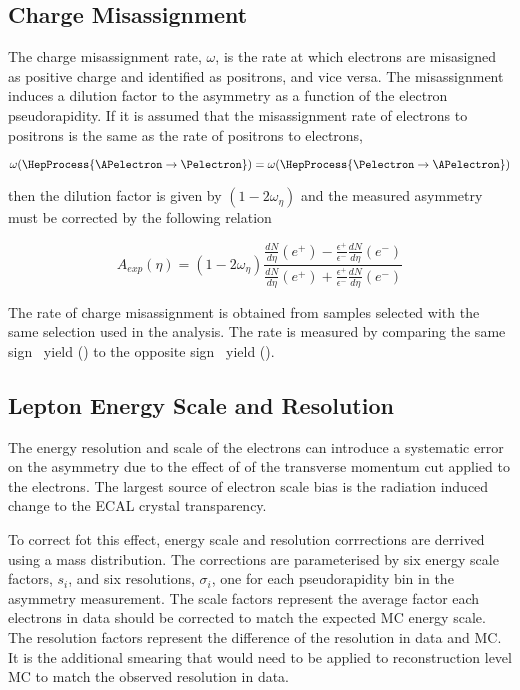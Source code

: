 \subsection{Charge Misassignment}

The charge misassignment rate, $\omega$, is the rate at which electrons are
misasigned as positive charge and identified as positrons, and vice versa. The
misassignment induces a dilution factor to the asymmetry as a function of the
electron pseudorapidity. If it is assumed that the misassignment rate of
electrons to positrons is the same as the rate of positrons to electrons, \ie 

\begin{equation}
  \omega( \HepProcess{\APelectron \to \Pelectron} ) =
  \omega( \HepProcess{\Pelectron \to \APelectron} )
\end{equation}

then the dilution factor is given by $(1-2\omega_\eta)$ and the measured
asymmetry must be corrected by the following relation

\begin{equation}
  A_{exp}(\eta) = (1-2\omega_\eta)
                \frac{
                    \frac{dN}{d\eta}(e^+)-
                    \frac{\epsilon^+}{\epsilon^-}\frac{dN}{d\eta}(e^-)
                }
                {
                    \frac{dN}{d\eta}(e^+)+
                    \frac{\epsilon^+}{\epsilon^-}\frac{dN}{d\eta}(e^-)
                }
\end{equation}

The rate of charge misassignment is obtained from \Zee samples selected with
the same selection used in the analysis. The rate is measured by comparing the
same sign \PZ\ yield (\HepProcess{\PZ\to\Pepm\Pepm}) to the opposite sign \PZ\
yield (\HepProcess{\PZ\to\Pepm\Pemp}).

\subsection{Lepton Energy Scale and Resolution}

The energy resolution and scale of the electrons can introduce a systematic
error on the asymmetry due to the effect of of the transverse momentum cut
applied to the electrons. The largest source of electron scale bias is the
radiation induced change to the ECAL crystal transparency.

To correct fot this effect, energy scale and resolution corrrections are
derrived using a \Zee mass distribution. The corrections are parameterised by
six energy scale factors, $s_i$, and six resolutions, $\sigma_i$, one for each
pseudorapidity bin in the asymmetry measurement.
The scale factors represent the average factor each electrons \Pt in data
should be corrected to match the expected \ac{MC} energy scale.
The resolution factors represent the difference of the resolution in data and
\ac{MC}. It is the additional smearing that would need to be applied to
reconstruction level \ac{MC} to match the observed resolution in data.

